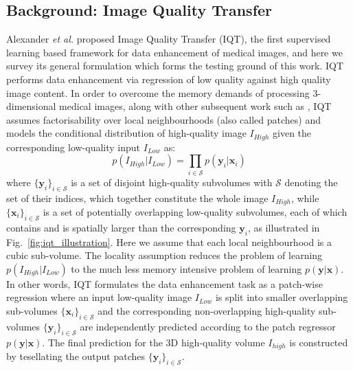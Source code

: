 \subsection{Background: Image Quality Transfer}
Alexander \emph{et al.} \cite{alexander2014image} proposed Image Quality Transfer (IQT), the first supervised learning based framework for data enhancement of medical images, and here we survey its general formulation which forms the testing ground of this work. IQT performs data enhancement via regression of low quality against high quality image content. In order to overcome the memory demands of processing 3-dimensional medical images, along with other subsequent work such as \cite{yang2016fast,oktay2016multi,bahrami2016convolutional,oktay2018anatomically}, IQT assumes factorisability over local neighbourhoods (also called patches) and models the conditional distribution of high-quality image $I_{High}$ given the corresponding low-quality input $I_{Low}$ as: 
\begin{equation}
p(I_{High}|I_{Low}) = \prod_{i\in \mathcal{S}} p(\mathbf{y}_{i}|\mathbf{x}_{i})
\end{equation}
where $\{\textbf{y}_{i}\}_{i \in \mathcal{S}}$ is a set of disjoint high-quality subvolumes with $\mathcal{S}$ denoting the set of their indices, which together constitute the whole image $I_{High}$, while $\{\textbf{x}_{i}\}_{i \in \mathcal{S}}$ is a set of potentially overlapping low-quality subvolumes, each of which contains and is spatially larger than the corresponding $\textbf{y}_{i}$, as illustrated in Fig.~\ref{fig:iqt_illustration}. Here we assume that each local neighbourhood is a cubic sub-volume. The locality assumption reduces the problem of learning $p(I_{High}|I_{Low})$ to the much less memory intensive problem of learning $p(\mathbf{y}|\mathbf{x})$. In other words, IQT formulates the data enhancement task as a patch-wise regression where an input low-quality image $I_{Low}$ is split into smaller overlapping sub-volumes  $\{\textbf{x}_{i}\}_{i \in \mathcal{S}}$ and the corresponding non-overlapping high-quality sub-volumes $\{\textbf{y}_{i}\}_{i \in \mathcal{S}}$ are independently predicted according to the patch regressor $p(\mathbf{y}|\mathbf{x})$. The final prediction for the 3D high-quality volume $I_{high}$ is constructed by tesellating the output patches $\{\textbf{y}_{i}\}_{i \in \mathcal{S}}$. 

